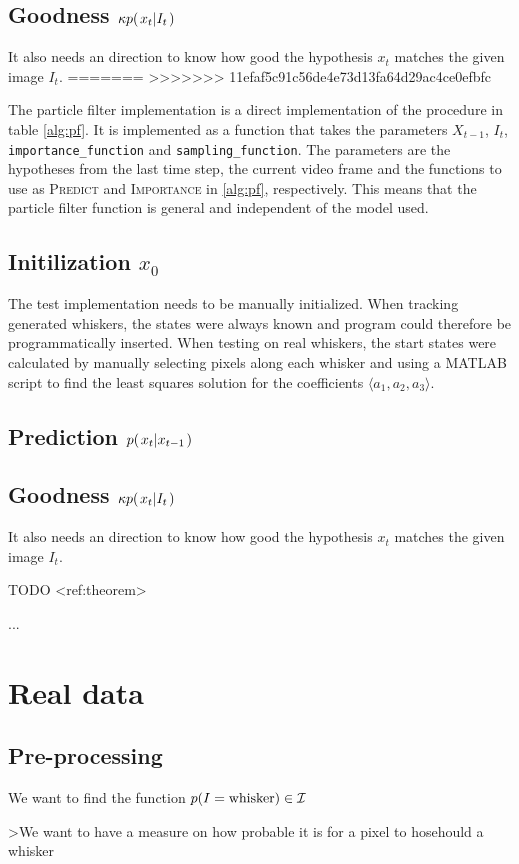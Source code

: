     \subsection{Goodness $\kappa p{(\left. x_t \middle\vert I_t \right.)}$}
        It also needs an direction to know how good the hypothesis $x_t$ matches the given image $I_t$.
=======
>>>>>>> 11efaf5c91c56de4e73d13fa64d29ac4ce0efbfc

The particle filter implementation is a direct implementation of the
procedure in table \ref{alg:pf}. It is implemented as a function that
takes the parameters $X_{t-1}$, $I_t$, \texttt{importance\_function} and
\texttt{sampling\_function}. The parameters are the hypotheses from
the last time step, the current video frame and the functions to use
as \textsc{Predict} and \textsc{Importance} in \ref{alg:pf},
respectively. This means that the particle filter function is general
and independent of the model used.

\subsection{Initilization $x_0$}
The test implementation needs to be manually initialized. When
tracking generated whiskers, the states were always known and program
could therefore be programmatically inserted. When testing on real
whiskers, the start states were calculated by manually
selecting pixels along each whisker and using a MATLAB script to find
the least squares solution for the coefficients $\langle a_1, a_2, a_3 \rangle$.

\subsection{Prediction $p{(\left. x_t \middle\vert x_{t-1} \right.)}$}


\subsection{Goodness $\kappa p{(\left. x_t \middle\vert I_t \right.)}$}
It also needs an direction to know how good the hypothesis $x_t$ matches the given image $I_t$.

TODO <ref:theorem>

...



\section{Real data}
    \subsection{Pre-processing}

    We want to find the function $p{(I=\text{whisker})}\in\mathcal{I}$

    >We want to have a measure on how probable it is for a pixel to hosehould a whisker






